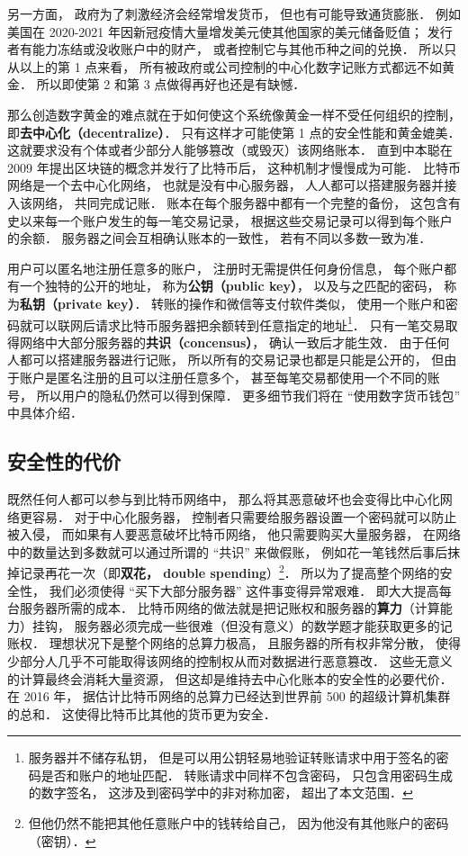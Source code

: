 另一方面， 政府为了刺激经济会经常增发货币， 但也有可能导致通货膨胀． 例如美国在 2020-2021 年因新冠疫情大量增发美元使其他国家的美元储备贬值； 发行者有能力冻结或没收账户中的财产， 或者控制它与其他币种之间的兑换． 所以只从以上的第 1 点来看， 所有被政府或公司控制的中心化数字记账方式都远不如黄金． 所以即使第 2 和第 3 点做得再好也还是有缺憾．

那么创造数字黄金的难点就在于如何使这个系统像黄金一样不受任何组织的控制， 即\textbf{去中心化（decentralize）}． 只有这样才可能使第 1 点的安全性能和黄金媲美． 这就要求没有个体或者少部分人能够篡改（或毁灭）该网络账本． 直到中本聪在 2009 年提出区块链的概念并发行了比特币后， 这种机制才慢慢成为可能． 比特币网络是一个去中心化网络， 也就是没有中心服务器， 人人都可以搭建服务器并接入该网络， 共同完成记账． 账本在每个服务器中都有一个完整的备份， 这包含有史以来每一个账户发生的每一笔交易记录， 根据这些交易记录可以得到每个账户的余额． 服务器之间会互相确认账本的一致性， 若有不同以多数一致为准．

用户可以匿名地注册任意多的账户， 注册时无需提供任何身份信息， 每个账户都有一个独特的公开的地址， 称为\textbf{公钥（public key）}， 以及与之匹配的密码， 称为\textbf{私钥（private key）}． 转账的操作和微信等支付软件类似， 使用一个账户和密码就可以联网后请求比特币服务器把余额转到任意指定的地址\footnote{服务器并不储存私钥， 但是可以用公钥轻易地验证转账请求中用于签名的密码是否和账户的地址匹配． 转账请求中同样不包含密码， 只包含用密码生成的数字签名， 这涉及到密码学中的非对称加密， 超出了本文范围．}． 只有一笔交易取得网络中大部分服务器的\textbf{共识（concensus）}， 确认一致后才能生效． 由于任何人都可以搭建服务器进行记账， 所以所有的交易记录也都是只能是公开的， 但由于账户是匿名注册的且可以注册任意多个， 甚至每笔交易都使用一个不同的账号， 所以用户的隐私仍然可以得到保障． 更多细节我们将在 “使用数字货币钱包” 中具体介绍．


\subsection{安全性的代价}
既然任何人都可以参与到比特币网络中， 那么将其恶意破坏也会变得比中心化网络更容易． 对于中心化服务器， 控制者只需要给服务器设置一个密码就可以防止被入侵， 而如果有人要恶意破坏比特币网络， 他只需要购买大量服务器， 在网络中的数量达到多数就可以通过所谓的 “共识” 来做假账， 例如花一笔钱然后事后抹掉记录再花一次（即\textbf{双花， double spending}）\footnote{但他仍然不能把其他任意账户中的钱转给自己， 因为他没有其他账户的密码（密钥）．}． 所以为了提高整个网络的安全性， 我们必须使得 “买下大部分服务器” 这件事变得异常艰难． 即大大提高每台服务器所需的成本． 比特币网络的做法就是把记账权和服务器的\textbf{算力}（计算能力）挂钩， 服务器必须完成一些很难（但没有意义）的数学题才能获取更多的记账权． 理想状况下是整个网络的总算力极高， 且服务器的所有权非常分散， 使得少部分人几乎不可能取得该网络的控制权从而对数据进行恶意篡改． 这些无意义的计算最终会消耗大量资源， 但这却是维持去中心化账本的安全性的必要代价． 在 2016 年， 据估计比特币网络的总算力已经达到世界前 500 的超级计算机集群的总和． 这使得比特币比其他的货币更为安全．

